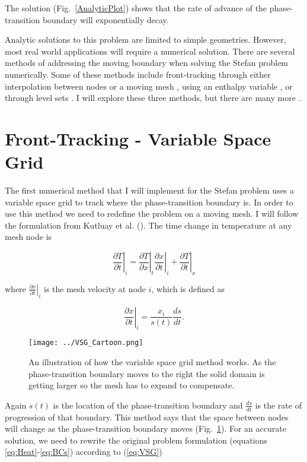 \documentclass[12pt]{article}
\begin{document}
The solution (Fig.~\ref{AnalyticPlot}) shows that the rate of advance of the phase-transition boundary will exponentially decay.

Analytic solutions to this problem are limited to simple geometries. However, most real world applications will require a numerical solution. There are several methods of addressing the moving boundary when solving the Stefan problem numerically. Some of these methods include front-tracking through either interpolation between nodes or a moving mesh \citep{Crank1975,Kutluay1997}, using an enthalpy variable \citep{Voller1981}, or through level sets \citep{Chen1997}. I will explore these three methods, but there are many more \citep{Crank1975}.

\section{Front-Tracking - Variable Space Grid}

The first numerical method that I will implement for the Stefan problem uses a variable space grid to track where the phase-transition boundary is. In order to use this method we need to redefine the problem on a moving mesh. I will follow the formulation from Kutluay et al. (\citeyear{Kutluay1997}). The time change in temperature at any mesh node is

\begin{equation}\label{eq:VSG}
\left. \frac{\partial T}{\partial t} \right |_i = 
\left. \frac{\partial T}{\partial x} \right |_t
\left. \frac{\partial x}{\partial t} \right |_i +
\left. \frac{\partial T}{\partial t} \right |_x
\end{equation}

where $\left. \frac{\partial x}{\partial t} \right |_i$ is the mesh velocity at node $i$, which is defined as

\begin{equation}
\left. \frac{\partial x}{\partial t} \right |_i = 
\frac{x_i}{s(t)} \frac{ds}{dt}.
\end{equation}

\begin{figure}[]
\centering
\texttt{[image: ../VSG\_Cartoon.png]}
\caption{An illustration of how the variable space grid method works. As the phase-transition boundary moves to the right the solid domain is getting larger so the mesh has to expand to compensate.}
\label{VSG}
\end{figure}

Again $s(t)$ is the location of the phase-transition boundary and $\frac{ds}{dt}$ is the rate of progression of that boundary. This method says that the space between nodes will change as the phase-transition boundary moves (Fig.~\ref{VSG}). For an accurate solution, we need to rewrite the original problem formulation (equations \ref{eq:Heat}-\ref{eq:BCs}) according to (\ref{eq:VSG})
\end{document}
